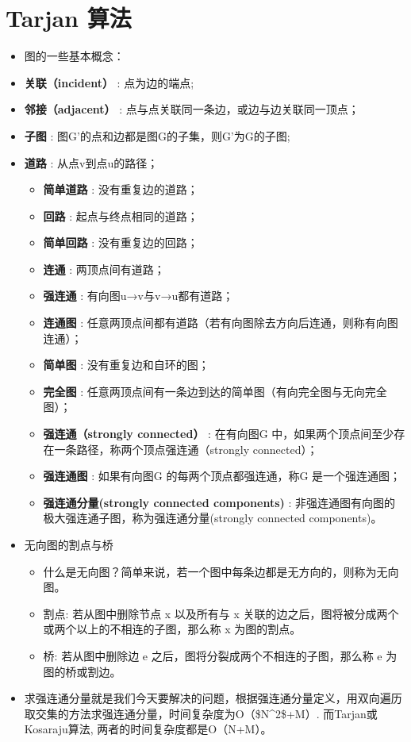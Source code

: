 \documentclass[9pt, b5paaper]{book}
\begin{document}
\section{Tarjan 算法}
\label{sec-1-3}
\begin{itemize}
\item 图的一些基本概念：
\item \textbf{关联（incident）} : 点为边的端点;
\item \textbf{邻接（adjacent）} : 点与点关联同一条边，或边与边关联同一顶点；
\item \textbf{子图} : 图G'的点和边都是图G的子集，则G'为G的子图;
\item \textbf{道路} : 从点v到点u的路径；
\begin{itemize}
\item \textbf{简单道路} : 没有重复边的道路；
\item \textbf{回路} : 起点与终点相同的道路；
\item \textbf{简单回路} : 没有重复边的回路；
\item \textbf{连通} : 两顶点间有道路；
\item \textbf{强连通} : 有向图u→v与v→u都有道路；
\item \textbf{连通图} : 任意两顶点间都有道路（若有向图除去方向后连通，则称有向图连通）；
\item \textbf{简单图} : 没有重复边和自环的图；
\item \textbf{完全图} : 任意两顶点间有一条边到达的简单图（有向完全图与无向完全图）；
\item \textbf{强连通（strongly connected）} : 在有向图G 中，如果两个顶点间至少存在一条路径，称两个顶点强连通（strongly connected）；
\item \textbf{强连通图} : 如果有向图G 的每两个顶点都强连通，称G 是一个强连通图；
\item \textbf{强连通分量(strongly connected components)} : 非强连通图有向图的极大强连通子图，称为强连通分量(strongly connected components)。
\end{itemize}
\item 无向图的割点与桥
\begin{itemize}
\item 什么是无向图？简单来说，若一个图中每条边都是无方向的，则称为无向图。
\item 割点: 若从图中删除节点 x 以及所有与 x 关联的边之后，图将被分成两个或两个以上的不相连的子图，那么称 x 为图的割点。
\item 桥: 若从图中删除边 e 之后，图将分裂成两个不相连的子图，那么称 e 为图的桥或割边。
\end{itemize}
\item 求强连通分量就是我们今天要解决的问题，根据强连通分量定义，用双向遍历取交集的方法求强连通分量，时间复杂度为O（\$N\^{}2\$+M）. 而Tarjan或Kosaraju算法, 两者的时间复杂度都是O（N+M）。
\end{itemize}
\end{document}
